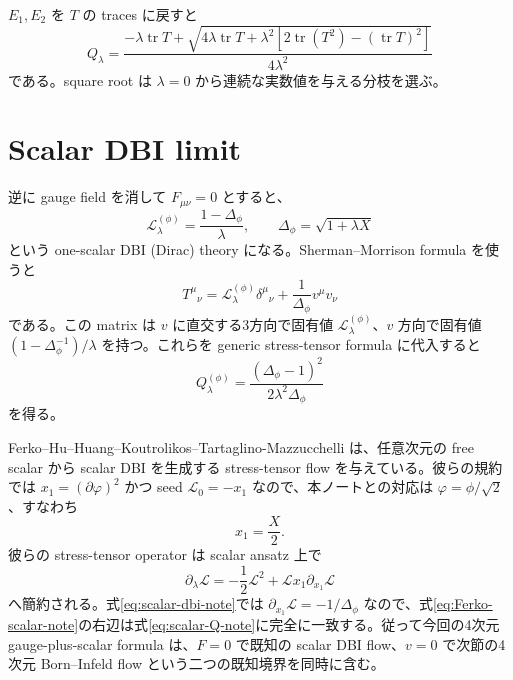\documentclass[a4paper,11pt]{ltjsreport}
\newcommand{\tr}{\operatorname{tr}}
\newcommand{\Lag}{\mathcal L}
\begin{document}
$E_1,E_2$ を $T$ の traces に戻すと
\begin{equation}
 Q_\lambda
 =\frac{-\lambda\tr T+
 \sqrt{4\lambda\tr T+\lambda^2\left[2\tr(T^2)-(\tr T)^2\right]}}
 {4\lambda^2}
 \label{eq:null-flow-T}
\end{equation}
である。square root は $\lambda=0$ から連続な実数値を与える分枝を選ぶ。

\section{Scalar DBI limit}

逆に gauge field を消して $F_{\mu\nu}=0$ とすると、
\begin{equation}
 \Lag_\lambda^{(\phi)}=\frac{1-\Delta_\phi}{\lambda},
 \qquad
 \Delta_\phi=\sqrt{1+\lambda X}
 \label{eq:scalar-dbi-note}
\end{equation}
という one-scalar DBI (Dirac) theory になる。Sherman--Morrison formula を使うと
\begin{equation}
 T^\mu{}_{\nu}
 =\Lag_\lambda^{(\phi)}\delta^\mu{}_{\nu}
 +\frac{1}{\Delta_\phi}v^\mu v_\nu
 \label{eq:scalar-T-note}
\end{equation}
である。この matrix は $v$ に直交する3方向で固有値 $\Lag_\lambda^{(\phi)}$、$v$ 方向で固有値 $(1-\Delta_\phi^{-1})/\lambda$ を持つ。これらを generic stress-tensor formula に代入すると
\begin{equation}
 Q_\lambda^{(\phi)}
 =\frac{(\Delta_\phi-1)^2}{2\lambda^2\Delta_\phi}
 \label{eq:scalar-Q-note}
\end{equation}
を得る。

Ferko--Hu--Huang--Koutrolikos--Tartaglino-Mazzucchelli は、任意次元の free scalar から scalar DBI を生成する stress-tensor flow を与えている\cite{Ferko2024DBI}。彼らの規約では $x_1=(\partial\varphi)^2$ かつ seed $\Lag_0=-x_1$ なので、本ノートとの対応は $\varphi=\phi/\sqrt2$、すなわち
\begin{equation}
 x_1=\frac X2.
\end{equation}
彼らの stress-tensor operator は scalar ansatz 上で
\begin{equation}
 \partial_\lambda\Lag=-\frac12\Lag^2+\Lag x_1\partial_{x_1}\Lag
 \label{eq:Ferko-scalar-note}
\end{equation}
へ簡約される。式\eqref{eq:scalar-dbi-note}では $\partial_{x_1}\Lag=-1/\Delta_\phi$ なので、式\eqref{eq:Ferko-scalar-note}の右辺は式\eqref{eq:scalar-Q-note}に完全に一致する。従って今回の4次元 gauge-plus-scalar formula は、$F=0$ で既知の scalar DBI flow、$v=0$ で次節の4次元 Born--Infeld flow という二つの既知境界を同時に含む。
\end{document}
